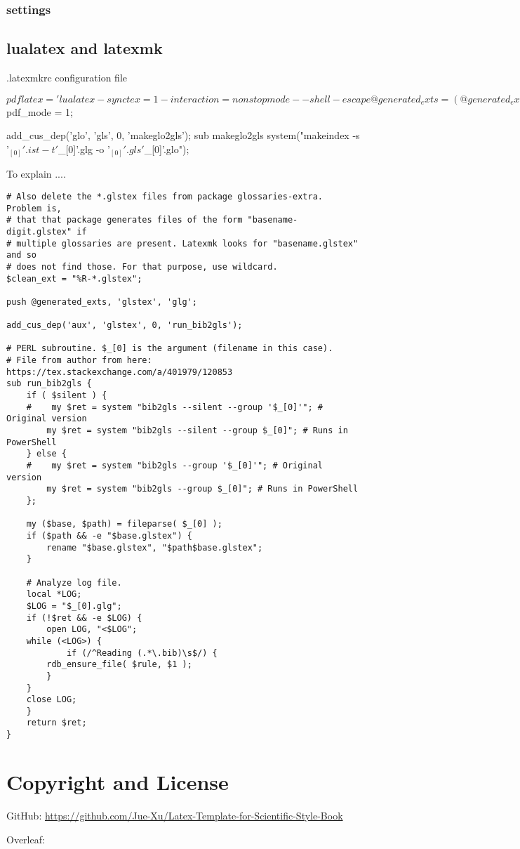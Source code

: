 \subsubsection{settings}

\subsection{lualatex and latexmk}
.latexmkrc configuration file
\begin{verbatim*}
	$pdflatex = 'lualatex -synctex=1 -interaction=nonstopmode --shell-escape %O %S';
	@generated_exts = (@generated_exts, 'synctex.gz');
	$pdf_mode = 1;

	add_cus_dep('glo', 'gls', 0, 'makeglo2gls');
	sub makeglo2gls {
		system("makeindex -s '$_[0]'.ist -t '$_[0]'.glg -o '$_[0]'.gls '$_[0]'.glo");
	}
\end{verbatim*}
To explain ....
\begin{verbatim}
# Also delete the *.glstex files from package glossaries-extra. Problem is,
# that that package generates files of the form "basename-digit.glstex" if
# multiple glossaries are present. Latexmk looks for "basename.glstex" and so
# does not find those. For that purpose, use wildcard.
$clean_ext = "%R-*.glstex";

push @generated_exts, 'glstex', 'glg';

add_cus_dep('aux', 'glstex', 0, 'run_bib2gls');

# PERL subroutine. $_[0] is the argument (filename in this case).
# File from author from here: https://tex.stackexchange.com/a/401979/120853
sub run_bib2gls {
    if ( $silent ) {
    #    my $ret = system "bib2gls --silent --group '$_[0]'"; # Original version
        my $ret = system "bib2gls --silent --group $_[0]"; # Runs in PowerShell
    } else {
    #    my $ret = system "bib2gls --group '$_[0]'"; # Original version
        my $ret = system "bib2gls --group $_[0]"; # Runs in PowerShell
    };

    my ($base, $path) = fileparse( $_[0] );
    if ($path && -e "$base.glstex") {
        rename "$base.glstex", "$path$base.glstex";
    }

    # Analyze log file.
    local *LOG;
    $LOG = "$_[0].glg";
    if (!$ret && -e $LOG) {
        open LOG, "<$LOG";
    while (<LOG>) {
            if (/^Reading (.*\.bib)\s$/) {
        rdb_ensure_file( $rule, $1 );
        }
    }
    close LOG;
    }
    return $ret;
}
\end{verbatim}

\section{Copyright and License}
GitHub: \url{https://github.com/Jue-Xu/Latex-Template-for-Scientific-Style-Book}

Overleaf: 